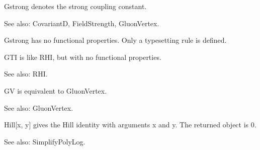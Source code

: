 
Gstrong denotes the strong coupling constant.

See also: CovariantD, FieldStrength, GluonVertex.


Gstrong has no functional properties. Only a typesetting rule is defined.





GTI is like RHI, but with no functional properties.

See also:  RHI.



GV is equivalent to GluonVertex.

See also:  GluonVertex.



Hill[x, y] gives the Hill identity with arguments x and y. The returned object is 0.

See also:  SimplifyPolyLog.







